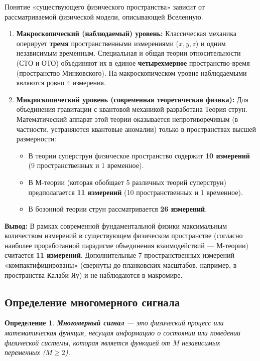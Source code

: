 \documentclass[12pt,a4paper]{article}
\newtheorem{definition}{Определение}
\begin{document}
Понятие «существующего физического пространства» зависит от рассматриваемой физической модели, описывающей Вселенную.

\begin{enumerate}
    \item \textbf{Макроскопический (наблюдаемый) уровень:}
    Классическая механика оперирует \textbf{тремя} пространственными измерениями ($x, y, z$) и одним независимым временным. Специальная и общая теории относительности (СТО и ОТО) объединяют их в единое \textbf{четырехмерное} пространство-время (пространство Минковского). На макроскопическом уровне наблюдаемыми являются ровно 4 измерения.

    \item \textbf{Микроскопический уровень (современная теоретическая физика):}
    Для объединения гравитации с квантовой механикой разработана Теория струн. Математический аппарат этой теории оказывается непротиворечивым (в частности, устраняются квантовые аномалии) только в пространствах высшей размерности:
    \begin{itemize}
        \item В теории суперструн физическое пространство содержит \textbf{10 измерений} (9 пространственных и 1 временное).
        \item В М-теории (которая обобщает 5 различных теорий суперструн) предполагается \textbf{11 измерений} (10 пространственных и 1 временное).
        \item В бозонной теории струн рассматривается \textbf{26 измерений}.
    \end{itemize}
\end{enumerate}

\textbf{Вывод:} В рамках современной фундаментальной физики максимальным количеством измерений в существующем физическом пространстве (согласно наиболее проработанной парадигме объединения взаимодействий — М-теории) считается \textbf{11 измерений}. Дополнительные 7 пространственных измерений «компактифицированы» (свернуты до планковских масштабов, например, в пространства Калаби-Яу) и не наблюдаются в макромире.

\subsection{Определение многомерного сигнала}

\begin{definition}
\textbf{Многомерный сигнал} — это физический процесс или математическая функция, несущая информацию о состоянии или поведении физической системы, которая является функцией от $M$ независимых переменных ($M \ge 2$).
\end{definition}
\end{document}

